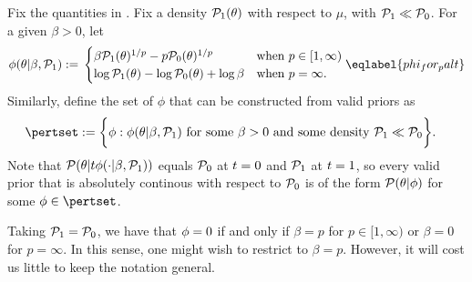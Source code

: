 
\begin{defn}
%
Fix the quantities in .  Fix a density $\mathcal{P}_{1}(\theta)$
with respect to $\mu$, with $\mathcal{P}_{1} \ll \mathcal{P}_{0}$. For a given $\beta > 0$, let
%
\begin{align}
%
\phi(\theta | \beta, \palt) :={}
\begin{cases}
\beta \palt(\theta)^{1/p} - p \pbase(\theta)^{1/p}
    & \textrm{when }p \in [1, \infty) \\
\log \palt(\theta) - \log \pbase(\theta) + \log \beta
    & \textrm{when }p = \infty.
\end{cases} \eqlabel{phi_for_palt}
%
\end{align}
%
Similarly, define the set of $\phi$ that can be constructed from
valid priors as
%
\begin{align*}
%
\pertset := \bigg\{&
    \phi:  \phi(\theta | \beta, \palt) %
    \textrm{ for some }\beta > 0\textrm{ and some density }\palt \ll \pbase
\bigg\}.
%
\end{align*}
%
Note that $\mathcal{P}(\theta \vert t \phi(\cdot \vert \beta, \mathcal{P}_{1}))$ equals $\mathcal{P}_{0}$
at $t = 0$ and $\mathcal{P}_{1}$ at $t = 1$, so every valid prior that is absolutely
continous with respect to $\mathcal{P}_{0}$ is of the form $\mathcal{P}(\theta \vert \phi)$ for
some $\phi \in \pertset$.
%
\end{defn}



\begin{ex}
%
Taking $\mathcal{P}_{1} = \mathcal{P}_{0}$, we have that $\phi = 0$ if and only if $\beta = p$
for $p \in [1, \infty)$ or $\beta = 0$ for $p = \infty$. In this sense, one
might wish to restrict to $\beta = p$.  However, it will cost us little to keep
the notation general.
%
\end{ex}

